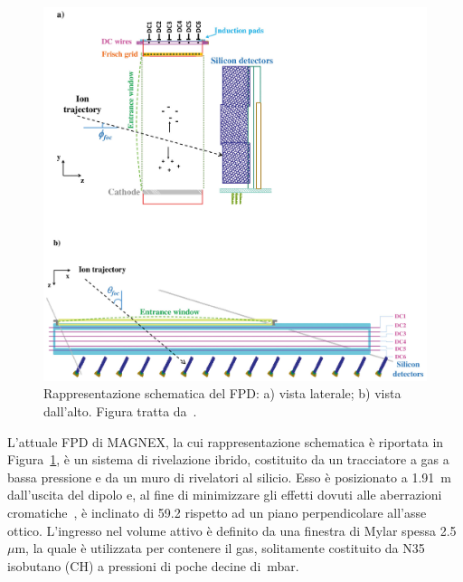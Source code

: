 

\subsection{} \label{sez:fpd}

\begin{figure} [!p]
	\centering
	\includegraphics[width=\textwidth, keepaspectratio]{Grafici/fpd.png}
	\caption{Rappresentazione schematica del FPD: a) vista laterale; b) vista dall'alto. Figura tratta da~\cite{cappuzzello:epja18}.} \label{fig:fpd}
\end{figure}


L'attuale FPD di MAGNEX, la cui rappresentazione schematica è riportata in Figura~\ref{fig:fpd}, è un sistema di rivelazione ibrido, costituito da un tracciatore a gas a bassa pressione e da un muro di rivelatori al silicio.
Esso è posizionato a 1.91~m dall'uscita del dipolo e, al fine di minimizzare gli effetti dovuti alle aberrazioni cromatiche~\cite{cunsolo:nima01}, è inclinato di 59.2\textdegree{} rispetto ad un piano perpendicolare all'asse ottico.
L'ingresso nel volume attivo è definito da una finestra di Mylar spessa 2.5~$\mu$m, la quale è utilizzata per contenere il gas, solitamente costituito da N35 isobutano (CH) a pressioni di poche decine di~mbar.



